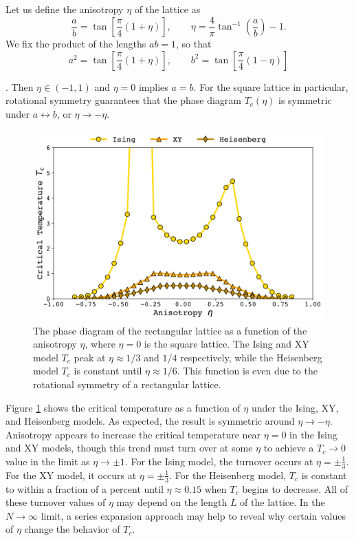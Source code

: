 \documentclass[
  amsmath,
  amssymb,
  aps,
  twocolumn,
  nofootinbib,
  floatfix,
]{revtex4-2}
\newcommand{\parens}[1]{\left ( #1 \right )}
\newcommand{\brackets}[1]{\left [ #1 \right ]}
\begin{document}
Let us define the anisotropy $\eta$ of the lattice as 
\begin{equation}
  \frac{a}{b} = \tan\brackets{\frac{\pi}{4}\parens{1+\eta}},\qquad \eta = \frac{4}{\pi}\tan^{-1}\parens{\frac{a}{b}}-1.
  \label{eqn:anisotropy}
\end{equation}
We fix the product of the lengths $ab=1$, so that 
\begin{equation}
  a^2 = \tan\brackets{\frac{\pi}{4}\parens{1+\eta}},\qquad b^2 = \tan\brackets{\frac{\pi}{4}\parens{1-\eta}}
\end{equation}

. Then $\eta \in (-1,1)$ and $\eta=0$ implies $a=b$. For the square lattice in particular, rotational symmetry guarantees that the phase diagram $T_c(\eta)$ is symmetric under $a\leftrightarrow b$, or $\eta \rightarrow -\eta$.

\begin{figure}
  \centering
  \includegraphics[width=\linewidth]{../figs/rect-phase.pdf}
  \caption{The phase diagram of the rectangular lattice as a function of the anisotropy $\eta$, where $\eta = 0$ is the square lattice. The Ising and XY model $T_c$ peak at $\eta \approx 1/3$ and $1/4$ respectively, while the Heisenberg model $T_c$ is constant until $\eta \approx 1/6$. This function is even due to the rotational symmetry of a rectangular lattice.}
  \label{fig:rect-phase}
\end{figure}

Figure \ref{fig:rect-phase} shows the critical temperature as a function of $\eta$ under the Ising, XY, and Heisenberg models. As expected, the result is symmetric around $\eta \rightarrow -\eta$. Anisotropy appears to increase the critical temperature near $\eta = 0$ in the Ising and XY models, though this trend must turn over at some $\eta$ to achieve a $T_c\rightarrow 0$ value in the limit as $\eta \rightarrow \pm 1$. For the Ising model, the turnover occurs at $\eta=\pm\frac{1}{3}$. For the XY model, it occurs at $\eta = \pm \frac{1}{3}$. For the Heisenberg model, $T_c$ is constant to within a fraction of a percent until $\eta \approx 0.15$ when $T_c$ begins to decrease. All of these turnover values of $\eta$ may depend on the length $L$ of the lattice. In the $N\rightarrow \infty$ limit, a series expansion approach may help to reveal why certain values of $\eta$ change the behavior of $T_c$.
\end{document}
